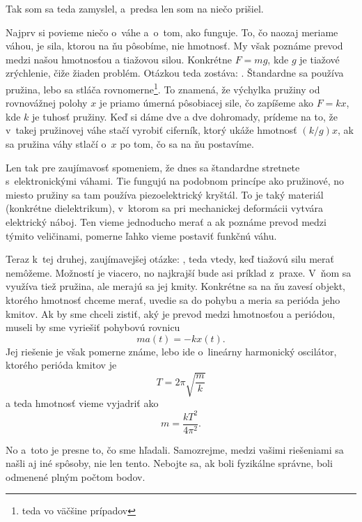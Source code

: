 Tak som sa teda zamyslel, a~predsa len som na niečo prišiel.

Najprv si povieme niečo o~váhe a~o~tom, ako funguje.
To, čo naozaj meriame váhou, je sila, ktorou na ňu pôsobíme, nie hmotnosť.
My však poznáme prevod medzi našou hmotnosťou a tiažovou silou.
Konkrétne $F = mg$, kde $g$ je tiažové zrýchlenie, čiže žiaden problém.
Otázkou teda zostáva: .
Štandardne sa používa pružina, lebo sa stláča rovnomerne\footnote{teda vo väčšine prípadov}.
To znamená, že výchylka pružiny od rovnovážnej polohy $x$ je priamo úmerná pôsobiacej sile, čo zapíšeme ako
$F = k x$, kde $k$ je tuhosť pružiny. Keď si dáme dve a dve dohromady, prídeme na to, že 
v~takej pružinovej váhe stačí vyrobiť ciferník, ktorý ukáže hmotnosť $(k/g)x$,
ak sa pružina váhy stlačí o~$x$ po tom, čo sa na ňu postavíme.

Len tak pre zaujímavosť spomeniem, že dnes sa štandardne stretnete s~elektronickými váhami.
Tie fungujú na podobnom princípe ako pružinové, no miesto pružiny sa tam používa piezoelektrický kryštál.
To je taký materiál (konkrétne dielektrikum), v~ktorom sa pri mechanickej deformácii vytvára elektrický náboj.
Ten vieme jednoducho merať a ak poznáme prevod medzi týmito veličinami, pomerne ľahko vieme postaviť funkčnú váhu.

Teraz k~tej druhej, zaujímavejšej otázke: ,
teda vtedy, keď tiažovú silu merať nemôžeme.
Možností je viacero, no najkrajší bude asi príklad z~praxe. V~ňom sa využíva tiež pružina, ale merajú sa jej kmity.
Konkrétne sa na ňu zavesí objekt, ktorého hmotnosť chceme merať, uvedie sa do pohybu a meria sa 
perióda jeho kmitov. Ak by sme chceli zistiť, aký je prevod medzi hmotnosťou a periódou,
museli by sme vyriešiť pohybovú rovnicu
$$m a(t) = -k x(t)\text{.}$$ 
Jej riešenie je však pomerne známe, lebo ide o~lineárny harmonický oscilátor,
ktorého perióda kmitov je
$$T = 2 \pi \sqrt{\frac{m}{k}}$$
a teda hmotnosť vieme vyjadriť ako
$$m = \dfrac{kT^2}{4 \pi^2}\text{.}$$

No a~toto je presne to, čo sme hľadali. Samozrejme, medzi vašimi riešeniami sa našli aj iné spôsoby, nie len tento.
Nebojte sa, ak boli fyzikálne správne, boli odmenené plným počtom bodov.

